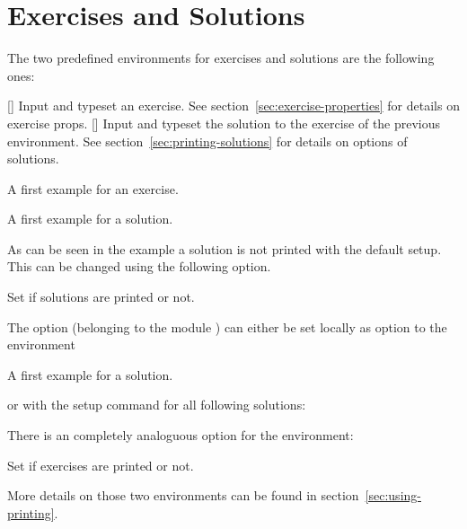 \documentclass{xsim-manual}
\begin{document}
\section{Exercises and Solutions}

The two predefined environments for exercises and solutions are the following
ones:
\begin{environments}
  []
    Input and typeset an exercise.  See section~\vref{sec:exercise-properties}
    for details on exercise \acsp*{prop}.
  []
    Input and typeset the solution to the exercise of the previous
     environment.  See section~\vref{sec:printing-solutions} for
    details on options of solutions.
\end{environments}

\begin{example}
  \begin{exercise}
    A first example for an exercise.
  \end{exercise}
  \begin{solution}
    A first example for a solution.
  \end{solution}
\end{example}

As can be seen in the example a solution is not printed with the default
setup.  This can be changed using the following option.
\begin{options}
    Set if solutions are printed or not.
\end{options}

The option (belonging to the module ) can either be set
locally as option to the  environment
\begin{sourcecode}
  \begin{solution}[print=true]
    A first example for a solution.
  \end{solution}
\end{sourcecode}
or with the setup command for all following solutions:
\begin{sourcecode}
\end{sourcecode}

There is an completely analoguous option for the  environment:
\begin{options}
    Set if exercises are printed or not.
\end{options}
More details on those two environments can be found in
section~\vref{sec:using-printing}.
\end{document}
